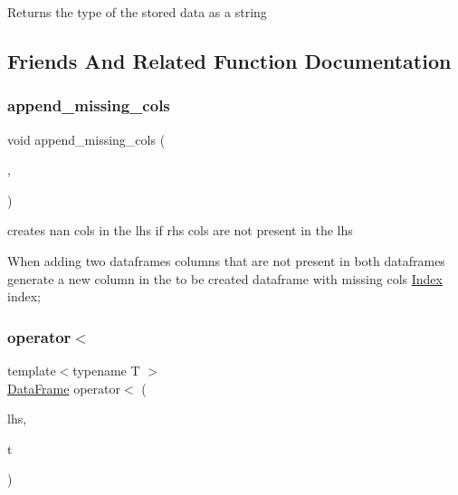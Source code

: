 Returns the type of the stored data as a string 

\subsection{Friends And Related Function Documentation}
\mbox{\label{classColumn_a27cc8acd51a5cd40e6a2726368914661}} 
\subsubsection{\texorpdfstring{append\+\_\+missing\+\_\+cols}{append\_missing\_cols}}
{\footnotesize\ttfamily void append\+\_\+missing\+\_\+cols (\begin{DoxyParamCaption}\item[{\hyperlink{classDataFrame}{Data\+Frame} \&}]{,  }\item[{const \hyperlink{classDataFrame}{Data\+Frame} \&}]{ }\end{DoxyParamCaption})\hspace{0.3cm}{\ttfamily [friend]}}



creates nan cols in the lhs if rhs cols are not present in the lhs 

When adding two dataframes columns that are not present in both dataframes generate a new column in the to be created dataframe with missing cols \hyperlink{classIndex}{Index} index; \mbox{\label{classColumn_a92ccb0425c54a5b5cd6f78ed1bb4c3ff}} 
\subsubsection{\texorpdfstring{operator$<$}{operator<}}
{\footnotesize\ttfamily template$<$typename T $>$ \\
\hyperlink{classDataFrame}{Data\+Frame} operator$<$ (\begin{DoxyParamCaption}\item[{const \hyperlink{classDataFrame}{Data\+Frame} \&}]{lhs,  }\item[{const T \&}]{t }\end{DoxyParamCaption})\hspace{0.3cm}{\ttfamily [friend]}}



